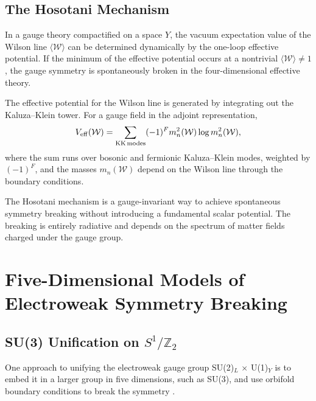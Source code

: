 \subsection{The Hosotani Mechanism}

\begin{theorem}
\label{thm:hosotani-mechanism}
In a gauge theory compactified on a space \(Y\), the vacuum expectation value of
the Wilson line \(\langle \mathcal{W} \rangle\) can be determined dynamically by
the one-loop effective potential.  If the minimum of the effective potential
occurs at a nontrivial \(\langle \mathcal{W} \rangle \neq 1\), the gauge symmetry
is spontaneously broken in the four-dimensional effective theory.
\end{theorem}

The effective potential for the Wilson line is generated by integrating out the
Kaluza--Klein tower.  For a gauge field in the adjoint representation,
\begin{equation}
  V_{\rm eff}(\mathcal{W}) = \sum_{{\rm KK\,modes}} (-1)^F m_n^2(\mathcal{W}) \log m_n^2(\mathcal{W}),
  \label{eq:hosotani-effective-potential}
\end{equation}
where the sum runs over bosonic and fermionic Kaluza--Klein modes, weighted by
\((-1)^F\), and the masses \(m_n(\mathcal{W})\) depend on the Wilson line through
the boundary conditions.

\begin{remark}
The Hosotani mechanism is a gauge-invariant way to achieve spontaneous symmetry
breaking without introducing a fundamental scalar potential.  The breaking is
entirely radiative and depends on the spectrum of matter fields charged under
the gauge group.
\end{remark}

\section{Five-Dimensional Models of Electroweak Symmetry Breaking}
\label{sec:five-d-electroweak-models}

\subsection{SU(3) Unification on \(S^1/\mathbb{Z}_2\)}

One approach to unifying the electroweak gauge group SU(2)\(_L\) \(\times\) U(1)\(_Y\)
is to embed it in a larger group in five dimensions, such as SU(3), and use
orbifold boundary conditions to break the symmetry \cite{Csaki2004, Pomarol2000}.

